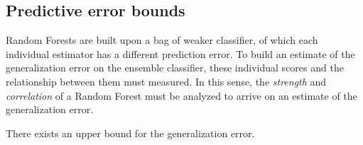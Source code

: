 \subsection{Predictive error bounds}

Random Forests are built upon a bag of weaker classifier, of which each individual estimator has a different prediction error. To build an estimate of the generalization error on the ensemble classifier, these individual scores and the relationship between them must measured. In this sense, the \textit{strength} and \textit{correlation} of a Random Forest must be analyzed to arrive on an estimate of the generalization error.


\begin{theorem}
There exists an upper bound for the generalization error.
\end{theorem}


